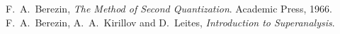 \begin{thebibliography}{99}

F.~A.~Berezin,
\textit{The Method of Second Quantization}.
Academic Press, 1966.
F.~A.~Berezin, A.~A.~Kirillov and D.~Leites,
\textit{Introduction to Superanalysis}.
\end{thebibliography}
